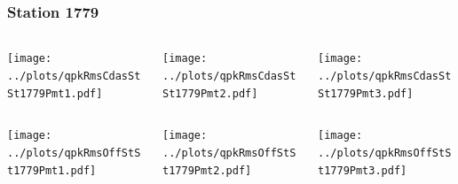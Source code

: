 \documentclass[aspectratio=169]{beamer}
\begin{document}
\begin{frame} 
  \frametitle{Station 1779}
  \begin{center}
    \begin{columns}
      \begin{column}{0.33\textwidth}
        \texttt{[image: ../plots/qpkRmsCdasStSt1779Pmt1.pdf]}
      \end{column}
      \begin{column}{0.33\textwidth}
        \texttt{[image: ../plots/qpkRmsCdasStSt1779Pmt2.pdf]}
      \end{column}
      \begin{column}{0.33\textwidth}
        \texttt{[image: ../plots/qpkRmsCdasStSt1779Pmt3.pdf]}
      \end{column}
    \end{columns}
  \end{center}

  \begin{center}
    \begin{columns}
      \begin{column}{0.33\textwidth}
        \texttt{[image: ../plots/qpkRmsOffStSt1779Pmt1.pdf]}
      \end{column}
      \begin{column}{0.33\textwidth}
        \texttt{[image: ../plots/qpkRmsOffStSt1779Pmt2.pdf]}
      \end{column}
      \begin{column}{0.33\textwidth}
        \texttt{[image: ../plots/qpkRmsOffStSt1779Pmt3.pdf]}
      \end{column}
    \end{columns}
  \end{center}
\end{frame}
\end{document}
